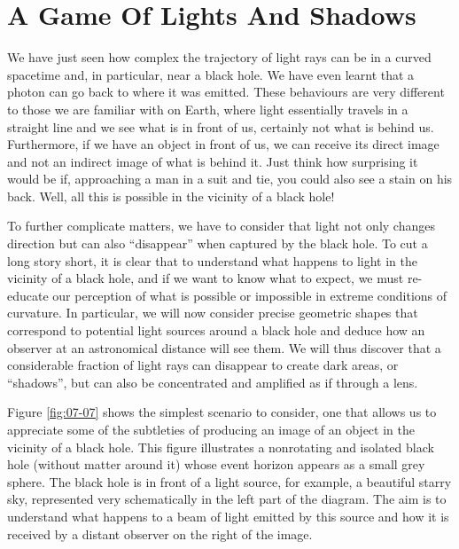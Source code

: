 \section{A Game Of Lights And Shadows}\label{sec:07-shadow}

We have just seen how complex the trajectory of light rays can be in a curved spacetime
and, in particular, near a black hole. We have even learnt that a photon can go back to
where it was emitted. These behaviours are very different to those we are familiar with
on Earth, where light essentially travels in a straight line and we see what is in front
of us, certainly not what is behind us. Furthermore, if we have an object in front of
us, we can receive its direct image and not an indirect image of what is behind it. Just
think how surprising it would be if, approaching a man in a suit and tie, you could also
see a stain on his back. Well, all this is possible in the vicinity of a black hole!

To further complicate matters, we have to consider that light not only changes direction
but can also ``disappear'' when captured by the black hole. To cut a long story short,
it is clear that to understand what happens to light in the vicinity of a black hole,
and if we want to know what to expect, we must re-educate our
perception of what is possible or impossible in extreme conditions of
curvature. In particular, we will now consider precise geometric shapes that correspond
to potential light sources around a black hole and deduce how an observer at an
astronomical distance will see them. We will thus discover that a considerable fraction
of light rays can disappear to create dark areas, or ``shadows'', but can also be
concentrated and amplified as if through a lens.

Figure \ref{fig:07-07} shows the simplest scenario to consider, one that allows us to appreciate
some of the subtleties of producing an image of an object in the vicinity of a black
hole. This figure illustrates a nonrotating and isolated black hole (without matter
around it) whose event horizon appears as a small grey sphere. The
black hole is in front of a light source, for example, a beautiful starry sky,
represented very schematically in the left part of the diagram. The aim is to understand
what happens to a beam of light emitted by this source and how it is received by a
distant observer on the right of the image.

